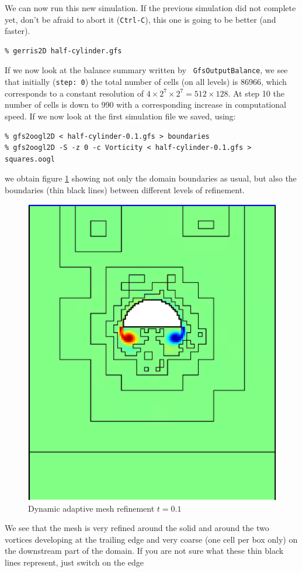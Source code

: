 \documentclass[a4paper]{article}
\begin{document}
We can now run this new simulation. If the previous simulation did not
complete yet, don't be afraid to abort it ({\tt Ctrl-C}), this one is going to
be better (and faster).
\begin{verbatim}
% gerris2D half-cylinder.gfs
\end{verbatim}
If we now look at the balance summary written by {\tt
GfsOutputBalance}, we see that initially ({\tt step: 0}) the total
number of cells (on all levels) is 86966, which corresponds to a
constant resolution of $4\times 2^7\times 2^7=512\times 128$. At step
10 the number of cells is down to 990 with a corresponding increase in 
computational speed. If we now look at the first simulation file we
saved, using:
\begin{verbatim}
% gfs2oogl2D < half-cylinder-0.1.gfs > boundaries
% gfs2oogl2D -S -z 0 -c Vorticity < half-cylinder-0.1.gfs > squares.oogl
\end{verbatim}
we obtain figure \ref{refined1} showing not only the domain boundaries 
as usual, but also the boundaries (thin black lines) between different
levels of refinement.
\begin{figure}[htbp]
\begin{center}
\includegraphics[angle=90,width=0.6\hsize]{refined1.eps}
\end{center}
\caption{Dynamic adaptive mesh refinement $t=0.1$}
\label{refined1}
\end{figure}
We see that the mesh is very refined around the solid and around the
two vortices developing at the trailing edge and very coarse (one cell
per box only) on the downstream part of the domain. If you are not
sure what these thin black lines represent, just switch on the edge
\end{document}
